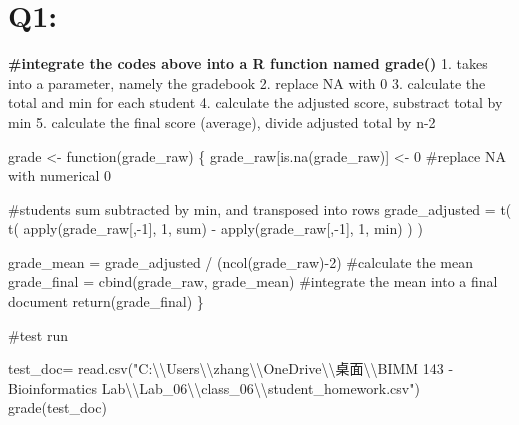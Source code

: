 \documentclass[
  letterpaper,
  DIV=11,
  numbers=noendperiod]{scrartcl}
\newenvironment{Shaded}{\begin{snugshade}}{\end{snugshade}}
\newcommand{\CommentTok}[1]{\textcolor[rgb]{0.37,0.37,0.37}{#1}}
\newcommand{\ControlFlowTok}[1]{\textcolor[rgb]{0.00,0.23,0.31}{#1}}
\newcommand{\DecValTok}[1]{\textcolor[rgb]{0.68,0.00,0.00}{#1}}
\newcommand{\FunctionTok}[1]{\textcolor[rgb]{0.28,0.35,0.67}{#1}}
\newcommand{\NormalTok}[1]{\textcolor[rgb]{0.00,0.23,0.31}{#1}}
\newcommand{\OtherTok}[1]{\textcolor[rgb]{0.00,0.23,0.31}{#1}}
\newcommand{\SpecialCharTok}[1]{\textcolor[rgb]{0.37,0.37,0.37}{#1}}
\newcommand{\StringTok}[1]{\textcolor[rgb]{0.13,0.47,0.30}{#1}}
\begin{document}
\hypertarget{q1}{%
\section{Q1:}\label{q1}}

\textbf{\#integrate the codes above into a R function named grade()} 1.
takes into a parameter, namely the gradebook 2. replace NA with 0 3.
calculate the total and min for each student 4. calculate the adjusted
score, substract total by min 5. calculate the final score (average),
divide adjusted total by n-2

\begin{Shaded}
\begin{Highlighting}[]
\NormalTok{grade }\OtherTok{\textless{}{-}} \ControlFlowTok{function}\NormalTok{(grade\_raw) \{}
\NormalTok{   grade\_raw[}\FunctionTok{is.na}\NormalTok{(grade\_raw)] }\OtherTok{\textless{}{-}} \DecValTok{0} \CommentTok{\#replace NA with numerical 0}
   
   \CommentTok{\#student\textquotesingle{}s sum subtracted by min, and transposed into rows}
\NormalTok{   grade\_adjusted }\OtherTok{=} \FunctionTok{t}\NormalTok{( }\FunctionTok{t}\NormalTok{( }\FunctionTok{apply}\NormalTok{(grade\_raw[,}\SpecialCharTok{{-}}\DecValTok{1}\NormalTok{], }\DecValTok{1}\NormalTok{, sum) }\SpecialCharTok{{-}} \FunctionTok{apply}\NormalTok{(grade\_raw[,}\SpecialCharTok{{-}}\DecValTok{1}\NormalTok{], }\DecValTok{1}\NormalTok{, min) ) ) }
   
\NormalTok{   grade\_mean }\OtherTok{=}\NormalTok{ grade\_adjusted }\SpecialCharTok{/}\NormalTok{ (}\FunctionTok{ncol}\NormalTok{(grade\_raw)}\SpecialCharTok{{-}}\DecValTok{2}\NormalTok{) }\CommentTok{\#calculate the mean}
\NormalTok{   grade\_final }\OtherTok{=} \FunctionTok{cbind}\NormalTok{(grade\_raw, grade\_mean) }\CommentTok{\#integrate the mean into a final document}
   \FunctionTok{return}\NormalTok{(grade\_final) }
\NormalTok{\}}
\end{Highlighting}
\end{Shaded}

\#test run

\begin{Shaded}
\begin{Highlighting}[]
\NormalTok{test\_doc}\OtherTok{=} \FunctionTok{read.csv}\NormalTok{(}\StringTok{"C:}\SpecialCharTok{\textbackslash{}\textbackslash{}}\StringTok{Users}\SpecialCharTok{\textbackslash{}\textbackslash{}}\StringTok{zhang}\SpecialCharTok{\textbackslash{}\textbackslash{}}\StringTok{OneDrive}\SpecialCharTok{\textbackslash{}\textbackslash{}}\StringTok{桌面}\SpecialCharTok{\textbackslash{}\textbackslash{}}\StringTok{BIMM 143 {-} Bioinformatics Lab}\SpecialCharTok{\textbackslash{}\textbackslash{}}\StringTok{Lab\_06}\SpecialCharTok{\textbackslash{}\textbackslash{}}\StringTok{class\_06}\SpecialCharTok{\textbackslash{}\textbackslash{}}\StringTok{student\_homework.csv"}\NormalTok{)}
\FunctionTok{grade}\NormalTok{(test\_doc)}
\end{Highlighting}
\end{Shaded}
\end{document}
